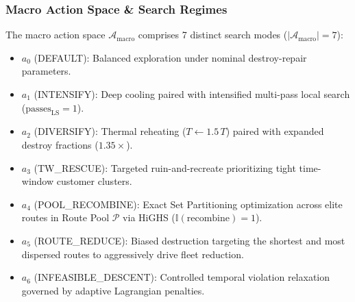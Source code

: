 \documentclass{ieeeaccess}
\begin{document}
\subsubsection{Macro Action Space \& Search Regimes}
The macro action space $\mathcal{A}_{\text{macro}}$ comprises 7 distinct search modes ($|\mathcal{A}_{\text{macro}}| = 7$):
\begin{itemize}
    \item $a_0$ (\textsf{\small DEFAULT}): Balanced exploration under nominal destroy-repair parameters.
    \item $a_1$ (\textsf{\small INTENSIFY}): Deep cooling paired with intensified multi-pass local search ($\text{passes}_{\text{LS}} = 1$).
    \item $a_2$ (\textsf{\small DIVERSIFY}): Thermal reheating ($T \leftarrow 1.5\,T$) paired with expanded destroy fractions ($1.35\times$).
    \item $a_3$ (\textsf{\small TW\_RESCUE}): Targeted ruin-and-recreate prioritizing tight time-window customer clusters.
    \item $a_4$ (\textsf{\small POOL\_RECOMBINE}): Exact Set Partitioning optimization across elite routes in Route Pool $\mathcal{P}$ via HiGHS ($\mathbb{I}(\text{recombine}) = 1$).
    \item $a_5$ (\textsf{\small ROUTE\_REDUCE}): Biased destruction targeting the shortest and most dispersed routes to aggressively drive fleet reduction.
    \item $a_6$ (\textsf{\small INFEASIBLE\_DESCENT}): Controlled temporal violation relaxation governed by adaptive Lagrangian penalties.
\end{itemize}
\end{document}
